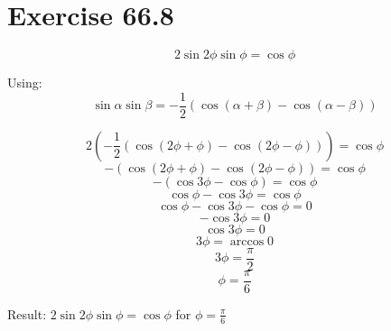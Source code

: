 \documentclass[a4paper, 10pt]{scrartcl}
\begin{document}
\section{Exercise 66.8}

\[2\sin{2\phi}\sin{\phi} = \cos{\phi}\]

Using:
\[\sin{\alpha}\sin{\beta} = -\frac{1}{2}(\cos{(\alpha + \beta)} - \cos{(\alpha - \beta)})\]

\[2\left(-\frac{1}{2}(\cos{(2\phi + \phi)} - \cos{(2\phi - \phi)})\right) = \cos{\phi}\]
\[-(\cos{(2\phi + \phi)} - \cos{(2\phi - \phi)}) = \cos{\phi}\]
\[-(\cos{3\phi} - \cos{\phi}) = \cos{\phi}\]
\[\cos{\phi} - \cos{3\phi} = \cos{\phi}\]
\[\cos{\phi} - \cos{3\phi} - \cos{\phi} = 0\]
\[-\cos{3\phi} = 0\]
\[\cos{3\phi} = 0\]
\[3\phi = \arccos{0}\]
\[3\phi = \frac{\pi}{2}\]
\[\phi = \frac{\pi}{6}\]

Result:
$2\sin{2\phi}\sin{\phi} = \cos{\phi}$ for $\phi = \frac{\pi}{6}$
\end{document}
